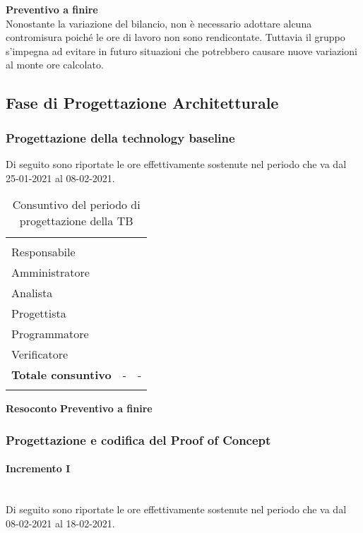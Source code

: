 \textbf{Preventivo a finire}\\
Nonostante la variazione del bilancio, non è necessario adottare alcuna contromisura poiché le ore di lavoro non sono rendicontate. Tuttavia il gruppo s'impegna ad evitare in futuro situazioni che potrebbero causare nuove variazioni al monte ore calcolato.

\subsection{Fase di Progettazione Architetturale}

\subsubsection{Progettazione della technology baseline}

Di seguito sono riportate le ore effettivamente sostenute nel periodo che va dal 25-01-2021 al 08-02-2021.

\begin{longtable}{ C{4cm} C{3cm} C{3.5cm}} 
 	 &
 	 &
 	 \\
 	
 	Responsabile &  & \\
 	Amministratore &  & \\
 	Analista & & \\
 	Progettista & & \\
 	Programmatore & &\\
 	Verificatore & & \\
 	
	\hline 	
 	
 	\textbf{Totale consuntivo} &
	- \color{coloreRosso}{\textbf{(+--)}} &
 	- \\	
 	
 	\caption{Consuntivo del periodo di progettazione della TB}
\end{longtable}

\textbf{Resoconto}
\textbf{Preventivo a finire}


\subsubsection{Progettazione e codifica del Proof of Concept}
\paragraph{Incremento I}\mbox{}\\
Di seguito sono riportate le ore effettivamente sostenute nel periodo che va dal 08-02-2021 al 18-02-2021.

